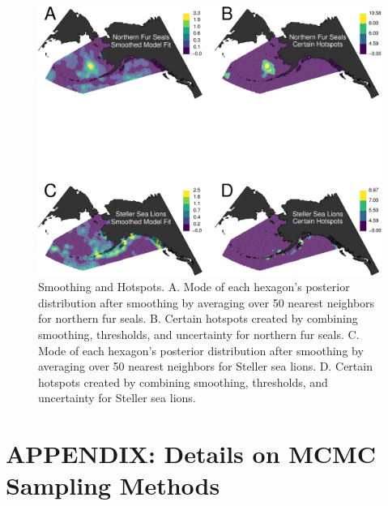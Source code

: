 \documentclass[11pt, titlepage]{article}
\begin{document}
\begin{spacing}{1.9}
\begin{flushleft}
\begin{figure}[H]
  \begin{center}
  \includegraphics[width=1\linewidth]{figures/Fig-SmooHotSpots}
  \end{center}
  \caption{Smoothing and Hotspots. A. Mode of each hexagon's posterior distribution after smoothing by averaging over 50 nearest neighbors for northern fur seals. B. Certain hotspots created by combining smoothing, thresholds, and uncertainty for northern fur seals. C. Mode of each hexagon's posterior distribution after smoothing by averaging over 50 nearest neighbors for Steller sea lions. D. Certain hotspots created by combining smoothing, thresholds, and uncertainty for Steller sea lions. \label{Fig-SmooHotSpots}}         
\end{figure} 



\clearpage
\setcounter{equation}{0}
\renewcommand{\theequation}{A.\arabic{equation}}
\setcounter{figure}{0}

\section*{APPENDIX: Details on MCMC Sampling Methods} \label{app:MCMCmeth}


\end{flushleft}
\end{spacing}
\end{document}
